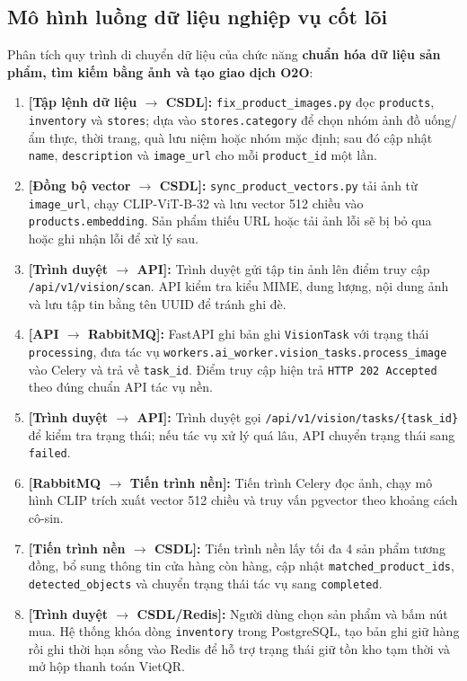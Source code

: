 \documentclass[12pt, a4paper]{article}
\begin{document}
\subsection{Mô hình luồng dữ liệu nghiệp vụ cốt lõi}
Phân tích quy trình di chuyển dữ liệu của chức năng \textbf{chuẩn hóa dữ liệu sản phẩm, tìm kiếm bằng ảnh và tạo giao dịch O2O}:
\begin{enumerate}
    \item \textbf{[Tập lệnh dữ liệu $\rightarrow$ CSDL]:} \texttt{fix\_product\_\allowbreak images.py} đọc \texttt{products}, \texttt{inventory} và \texttt{stores}; dựa vào \texttt{stores.category} để chọn nhóm ảnh đồ uống/ẩm thực, thời trang, quà lưu niệm hoặc nhóm mặc định; sau đó cập nhật \texttt{name}, \texttt{description} và \texttt{image\_url} cho mỗi \texttt{product\_id} một lần.
    \item \textbf{[Đồng bộ vector $\rightarrow$ CSDL]:} \texttt{sync\_product\_\allowbreak vectors.py} tải ảnh từ \texttt{image\_url}, chạy CLIP-ViT-B-32 và lưu vector 512 chiều vào \texttt{products.embedding}. Sản phẩm thiếu URL hoặc tải ảnh lỗi sẽ bị bỏ qua hoặc ghi nhận lỗi để xử lý sau.
    \item \textbf{[Trình duyệt $\rightarrow$ API]:} Trình duyệt gửi tập tin ảnh lên điểm truy cập \texttt{/api/v1/\allowbreak vision/\allowbreak scan}. API kiểm tra kiểu MIME, dung lượng, nội dung ảnh và lưu tập tin bằng tên UUID để tránh ghi đè.
    \item \textbf{[API $\rightarrow$ RabbitMQ]:} FastAPI ghi bản ghi \texttt{VisionTask} với trạng thái \texttt{processing}, đưa tác vụ \texttt{workers.\allowbreak ai\_worker.\allowbreak vision\_tasks.\allowbreak process\_image} vào Celery và trả về \texttt{task\_id}. Điểm truy cập hiện trả \texttt{HTTP 202 Accepted} theo đúng chuẩn API tác vụ nền.
    \item \textbf{[Trình duyệt $\rightarrow$ API]:} Trình duyệt gọi \texttt{/api/v1/\allowbreak vision/\allowbreak tasks/\allowbreak \{task\_id\}} để kiểm tra trạng thái; nếu tác vụ xử lý quá lâu, API chuyển trạng thái sang \texttt{failed}.
    \item \textbf{[RabbitMQ $\rightarrow$ Tiến trình nền]:} Tiến trình Celery đọc ảnh, chạy mô hình CLIP trích xuất vector 512 chiều và truy vấn pgvector theo khoảng cách cô-sin.
    \item \textbf{[Tiến trình nền $\rightarrow$ CSDL]:} Tiến trình nền lấy tối đa 4 sản phẩm tương đồng, bổ sung thông tin cửa hàng còn hàng, cập nhật \texttt{matched\_product\_ids}, \texttt{detected\_objects} và chuyển trạng thái tác vụ sang \texttt{completed}.
    \item \textbf{[Trình duyệt $\rightarrow$ CSDL/Redis]:} Người dùng chọn sản phẩm và bấm nút mua. Hệ thống khóa dòng \texttt{inventory} trong PostgreSQL, tạo bản ghi giữ hàng rồi ghi thời hạn sống vào Redis để hỗ trợ trạng thái giữ tồn kho tạm thời và mở hộp thanh toán VietQR.
\end{enumerate}
\end{document}
